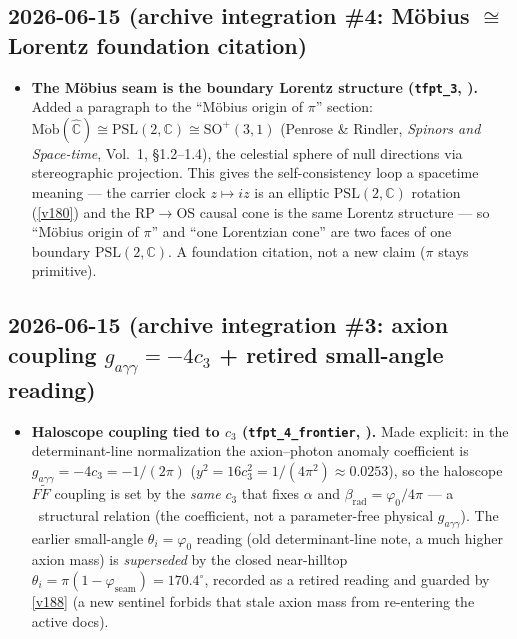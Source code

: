 \subsection*{2026-06-15 (archive integration \#4: M\"obius $\cong$ Lorentz foundation citation)}
\begin{itemize}
\item \textbf{The M\"obius seam is the boundary Lorentz structure (\texttt{tfpt\_3}, \mO).} Added a paragraph
  to the ``M\"obius origin of $\pi$'' section: $\mathrm{M\ddot{o}b}(\hat{\mathbb C})\cong\mathrm{PSL}(2,\mathbb C)
  \cong\mathrm{SO}^+(3,1)$ (Penrose \& Rindler, \emph{Spinors and Space-time}, Vol.~1, \S1.2--1.4), the
  celestial sphere of null directions via stereographic projection. This gives the self-consistency loop a
  spacetime meaning --- the carrier clock $z\mapsto iz$ is an elliptic $\mathrm{PSL}(2,\mathbb C)$ rotation
  (\vref{v180}) and the RP$\to$OS causal cone is the same Lorentz structure --- so ``M\"obius origin of $\pi$''
  and ``one Lorentzian cone'' are two faces of one boundary $\mathrm{PSL}(2,\mathbb C)$. A foundation citation,
  not a new claim ($\pi$ stays primitive).
\end{itemize}

\subsection*{2026-06-15 (archive integration \#3: axion coupling $g_{a\gamma\gamma}=-4c_3$ + retired small-angle reading)}
\begin{itemize}
\item \textbf{Haloscope coupling tied to $c_3$ (\texttt{tfpt\_4\_frontier}, \mC).} Made explicit: in the
  determinant-line normalization the axion--photon anomaly coefficient is $g_{a\gamma\gamma}=-4c_3=-1/(2\pi)$
  ($y^2=16c_3^2=1/(4\pi^2)\approx0.0253$), so the haloscope $F\tilde F$ coupling is set by the \emph{same}
  $c_3$ that fixes $\alpha$ and $\beta_{\mathrm{rad}}=\varphi_0/4\pi$ --- a \mC\ structural relation (the
  coefficient, not a parameter-free physical $g_{a\gamma\gamma}$). The earlier small-angle
  $\theta_i=\varphi_0$ reading (old determinant-line note, a much higher axion mass) is \emph{superseded} by
  the closed near-hilltop $\theta_i=\pi(1-\varphi_{\mathrm{seam}})=170.4^\circ$, recorded as a retired reading
  and guarded by \vref{v188} (a new sentinel forbids that stale axion mass from re-entering the active docs).
\end{itemize}

